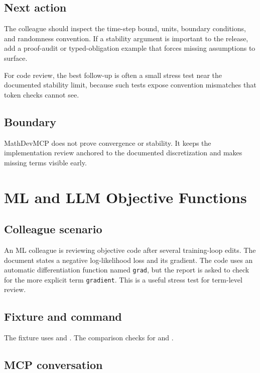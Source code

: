 \documentclass[12pt,a4paper,openany]{book}
\begin{document}
\section*{Next action}

The colleague should inspect the time-step bound, units, boundary conditions,
and randomness convention. If a stability argument is important to the release,
add a proof-audit or typed-obligation example that forces missing assumptions to
surface.

For code review, the best follow-up is often a small stress test near the
documented stability limit, because such tests expose convention mismatches
that token checks cannot see.

\section*{Boundary}

MathDevMCP does not prove convergence or stability. It keeps the implementation
review anchored to the documented discretization and makes missing terms visible
early.

\chapter{ML and LLM Objective Functions}

\section*{Colleague scenario}

An ML colleague is reviewing objective code after several training-loop edits.
The document states a negative log-likelihood loss and its gradient. The code
uses an automatic differentiation function named \texttt{grad}, but the report
is asked to check for the more explicit term \texttt{gradient}. This is a useful
stress test for term-level review.

\section*{Fixture and command}

The fixture uses  and
. The comparison checks
 for  and .

\section*{MCP conversation}
\end{document}
